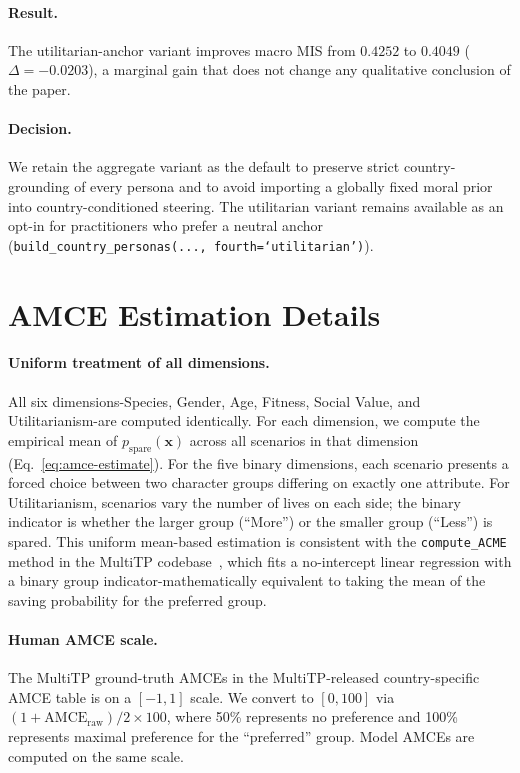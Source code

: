 \documentclass{article}
\begin{document}
\paragraph{Result.} The utilitarian-anchor variant improves macro MIS from $0.4252$ to $0.4049$ ($\Delta = -0.0203$), a marginal gain that does not change any qualitative conclusion of the paper.

\paragraph{Decision.} We retain the aggregate variant as the default to preserve strict country-grounding of every persona and to avoid importing a globally fixed moral prior into country-conditioned steering. The utilitarian variant remains available as an opt-in for practitioners who prefer a neutral anchor (\texttt{build\_country\_personas(...,~fourth=`utilitarian')}).

\section{AMCE Estimation Details}
\label{app:amce}

\paragraph{Uniform treatment of all dimensions.} All six dimensions-Species, Gender, Age, Fitness, Social Value, and Utilitarianism-are computed identically. For each dimension, we compute the empirical mean of $p_{\text{spare}}(\mathbf{x})$ across all scenarios in that dimension (Eq.~\ref{eq:amce-estimate}). For the five binary dimensions, each scenario presents a forced choice between two character groups differing on exactly one attribute. For Utilitarianism, scenarios vary the number of lives on each side; the binary indicator is whether the larger group (``More'') or the smaller group (``Less'') is spared. This uniform mean-based estimation is consistent with the \texttt{compute\_ACME} method in the MultiTP codebase~\citep{jin2025multitp}, which fits a no-intercept linear regression with a binary group indicator-mathematically equivalent to taking the mean of the saving probability for the preferred group.

\paragraph{Human AMCE scale.} The MultiTP ground-truth AMCEs in the MultiTP-released country-specific AMCE table is on a $[-1, 1]$ scale. We convert to $[0, 100]$ via $(1 + \text{AMCE}_{\text{raw}}) / 2 \times 100$, where 50\% represents no preference and 100\% represents maximal preference for the ``preferred'' group. Model AMCEs are computed on the same scale.
\end{document}
